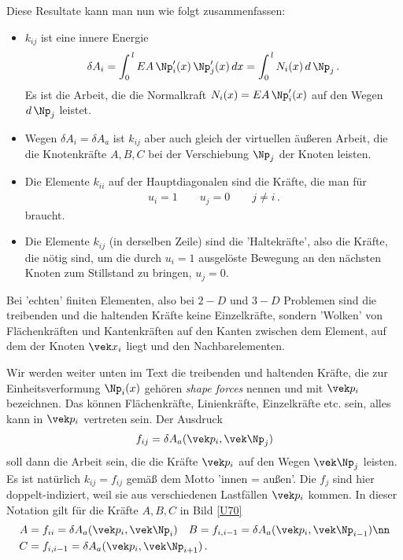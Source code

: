 {{{{Diese Resultate kann man nun wie folgt zusammenfassen:

\begin{itemize}
\item $k_{ij}$ ist eine innere Energie
\begin{align}
\delta A_i = \int_0^{\,l} EA\,\Np_i'(x)\,\Np_j'(x)\,dx = \int_0^{\,l} N_i(x)\,d\,\Np_j\,.
\end{align}
Es ist die Arbeit, die die Normalkraft $N_i(x) = EA\,\Np_i'(x)$ auf den Wegen $d\,\Np_j$ leistet.

\item Wegen $\delta A_i = \delta A_a$ ist $k_{ij}$ aber auch gleich der virtuellen \"{a}u{\ss}eren Arbeit, die die Knotenkr\"{a}fte $A, B, C$ bei der Verschiebung $\Np_j$ der Knoten leisten.
\item Die Elemente $k_{ii}$ auf der Hauptdiagonalen sind die Kr\"{a}fte, die man f\"{u}r
\begin{align}
u_i = 1 \qquad u_j = 0 \qquad j \neq i\,.
\end{align}
braucht.
\item Die Elemente $k_{ij}$ (in derselben Zeile) sind die 'Haltekr\"{a}fte', also die Kr\"{a}fte, die n\"{o}tig sind, um die durch $u_i = 1$ ausgel\"{o}ste Bewegung an den n\"{a}chsten Knoten zum Stillstand zu bringen, $u_j = 0$.
\end{itemize}
\begin{remark}
Bei 'echten' finiten Elementen, also bei $2-D$ und $3-D$ Problemen sind die treibenden und die haltenden Kr\"{a}fte keine Einzelkr\"{a}fte, sondern 'Wolken' von Fl\"{a}chenkr\"{a}ften und Kantenkr\"{a}ften auf den Kanten zwischen dem Element, auf dem der Knoten $\vek x_i$ liegt und den Nachbarelementen.

Wir werden weiter unten im Text die treibenden und haltenden Kr\"{a}fte, die zur Einheitsverformung $\Np_i(x)$ geh\"{o}ren {\em shape forces\/} nennen und mit $\vek p_i$ bezeichnen. Das k\"{o}nnen Fl\"{a}chenkr\"{a}fte, Linienkr\"{a}fte,  Einzelkr\"{a}fte etc. sein, alles kann in $\vek p_i$ vertreten sein. Der Ausdruck
\begin{align}
f_{ij} = \delta A_a(\vek p_i,\vek \Np_j)
\end{align}
soll dann die Arbeit sein, die die Kr\"{a}fte $\vek p_i$ auf den Wegen $\vek \Np_j$ leisten. Es ist nat\"{u}rlich $k_{ij} = f_{ij}$ gem\"{a}{\ss} dem Motto 'innen = au{\ss}en'. Die $f_j$ sind hier doppelt-indiziert, weil sie aus verschiedenen Lastf\"{a}llen $\vek p_i$ kommen.
In dieser Notation gilt f\"{u}r die Kr\"{a}fte $A, B, C$ in Bild \ref{U70}
\begin{align}
A &= f_{ii} = \delta A_a(\vek p_i,\vek \Np_i) \quad B = f_{i,i-1} =\delta A_a(\vek p_i,\vek \Np_{i-1})\nn \\
C &= f_{i,i-1} =\delta A_a(\vek p_i,\vek \Np_{i+1})\,.
\end{align}
  \end{remark}

}}}}
